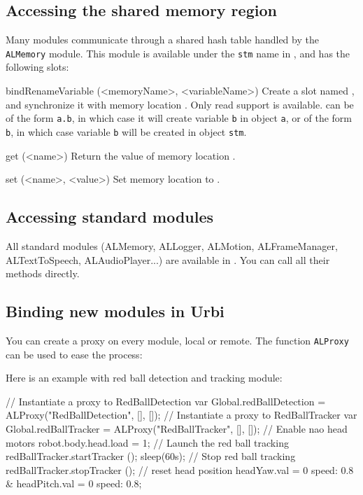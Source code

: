 \subsection{Accessing the \naoqi shared memory region}
Many \naoqi modules communicate through a shared hash table handled by
the \lstinline|ALMemory| module. This module is available under the
\lstinline|stm| name in \urbi, and has the following slots:

\begin{urbiscriptapi}
\item[bindRenameVariable](<memoryName>, <variableName>) Create a \us slot
  named , and synchronize it with memory location
  . Only read support is available.   can
  be of the form \lstinline{a.b}, in which case it will create variable
  \lstinline{b} in object \lstinline{a}, or of the form \lstinline{b}, in
  which case variable \lstinline{b} will be created in object
  \lstinline{stm}.


\item[get](<name>)
  Return the value of memory location .


\item[set](<name>, <value>)
  Set memory location  to .
\end{urbiscriptapi}

\subsection{Accessing standard \naoqi modules}

All standard \naoqi modules (ALMemory, ALLogger, ALMotion, ALFrameManager,
ALTextToSpeech, ALAudioPlayer...) are available in \urbi. You can call all
their methods directly.

\subsection{Binding new \naoqi modules in Urbi}

You can create a proxy on every \naoqi module, local or remote. The function
\lstinline|ALProxy| can be used to ease the process:

Here is an example with red ball detection and tracking module:
\begin{urbiunchecked}
// Instantiate a proxy to RedBallDetection
var Global.redBallDetection = ALProxy("RedBallDetection", [], []);
// Instantiate a proxy to RedBallTracker
var Global.redBallTracker = ALProxy("RedBallTracker", [], []);
// Enable nao head motors
robot.body.head.load = 1;
// Launch the red ball tracking
redBallTracker.startTracker ();
sleep(60s);
// Stop red ball tracking
redBallTracker.stopTracker ();
// reset head position
headYaw.val = 0 speed: 0.8 & headPitch.val = 0 speed: 0.8;
\end{urbiunchecked}

